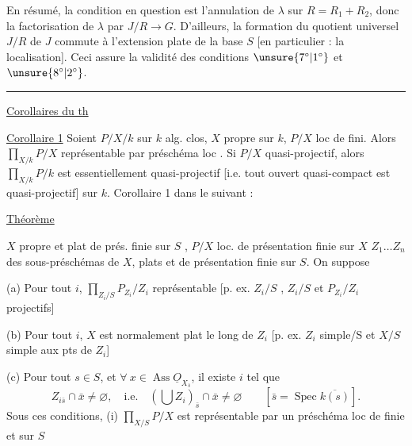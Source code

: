En résumé, la condition en question est
l'annulation de $\lambda$ sur $R=R_1+R_2$,
donc la factorisation de $\lambda$ par $J/R\longrightarrow G$.
D'ailleurs, la formation du quotient universel
$J/R$ de $J$ commute à l'extension plate
de la base $S$ [en particulier : la localisation].
Ceci assure la validité des conditions
\uline{$\unsure{7^\circ|1^\circ}$} et \uline{$\unsure{8^\circ|2^\circ}$}.
\par\noindent\rule{\linewidth}{0.4pt}\par
\uline{Corollaires du th}

\uline{Corollaire 1} Soient $P/X/k$ sur $k$ alg. clos,
$X$ propre sur $k$, $P/X$ loc de   fini. Alors
$\displaystyle\prod_{X/k}P/X$ représentable par préschéma loc .
Si $P/X$ quasi-projectif, 
alors $\displaystyle\prod_{X/k}P/k$ est
essentiellement quasi-projectif [i.e. tout ouvert
quasi-compact est quasi-projectif] sur $k$.
Corollaire 1   dans le suivant :

\uline{Théorème}

$X$ propre et plat de prés. finie sur $S$ ,
$P/X$ loc. de présentation finie sur $X$
$Z_1\ldots Z_n$ des sous-préschémas  de $X$, plats et de présentation finie
sur $S$. On suppose

(a) Pour tout $i$, $\displaystyle\prod_{Z_i/S}P_{Z_i}/Z_i$ représentable
[p. ex. $Z_i/S$ , 
$Z_i/S$ et $P_{Z_i}/Z_i$ projectifs]

(b) Pour tout $i$, $X$ est normalement plat le long de $Z_i$
[p. ex. $Z_i$ simple/S et $X/S$ simple aux pts de $Z_i$]

(c) Pour tout $s\in S$, et $\forall\ x\in\operatorname{Ass}\underline{O}_{X_{\bar s}}$, il existe $i$ tel que
\[
Z_{i\bar s}\cap\bar x\ne\varnothing,\quad\text{i.e.}\quad
(\bigcup Z_i)_{\bar s}\cap\bar x\ne\varnothing\qquad[\bar s=\operatorname{Spec}\overline{k(s)}].
\]
Sous ces conditions, (i) $\displaystyle\prod_{X/S}P/X$ est représentable
par un préschéma loc de   finie et  sur $S$

